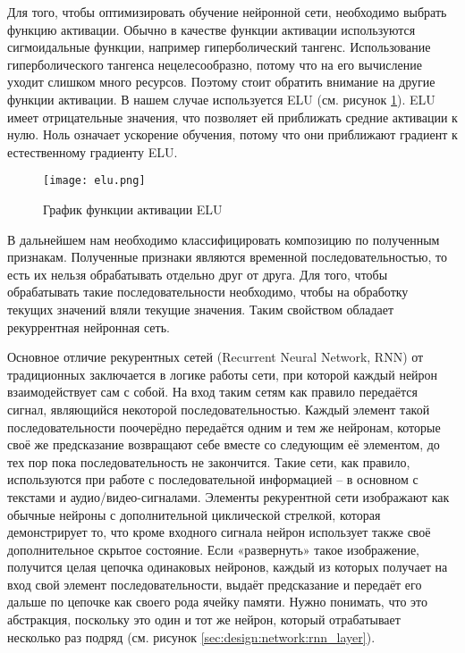 Для того, чтобы оптимизировать обучение нейронной сети, необходимо выбрать функцию активации. Обычно в качестве функции активации используются сигмоидальные функции, например гиперболический тангенс. Использование гиперболического тангенса нецелесообразно, потому что на его вычисление уходит слишком много ресурсов. Поэтому стоит обратить внимание на другие функции активации. В нашем случае используется ELU (см. рисунок \ref{sec:design:network:elu}). ELU имеет отрицательные значения, что позволяет ей приближать средние активации к нулю. Ноль означает ускорение обучения, потому что они приближают градиент к естественному градиенту ELU.

\begin{figure}[h]
\centering
	\texttt{[image: elu.png]}
	\caption{График функции активации ELU}
	\label{sec:design:network:elu}
\end{figure}

В дальнейшем нам необходимо классифицировать композицию по полученным признакам. Полученные признаки являются временной последовательностью, то есть их нельзя обрабатывать отдельно друг от друга. Для того, чтобы обрабатывать такие последовательности необходимо, чтобы на обработку текущих значений вляли текущие значения. Таким свойством обладает рекуррентная нейронная сеть.

Основное отличие рекурентных сетей (Recurrent Neural Network, RNN) от традиционных заключается в логике работы сети, при которой каждый нейрон взаимодействует сам с собой. На вход таким сетям как правило передаётся сигнал, являющийся некоторой последовательностью. Каждый элемент такой последовательности поочерёдно передаётся одним и тем же нейронам, которые своё же предсказание возвращают себе вместе со следующим её элементом, до тех пор пока последовательность не закончится. Такие сети, как правило, используются при работе с последовательной информацией -- в основном с текстами и аудио/видео-сигналами. Элементы рекурентной сети изображают как обычные нейроны с дополнительной циклической стрелкой, которая демонстрирует то, что кроме входного сигнала нейрон использует также своё дополнительное скрытое состояние. Если «развернуть» такое изображение, получится целая цепочка одинаковых нейронов, каждый из которых получает на вход свой элемент последовательности, выдаёт предсказание и передаёт его дальше по цепочке как своего рода ячейку памяти. Нужно понимать, что это абстракция, поскольку это один и тот же нейрон, который отрабатывает несколько раз подряд (см. рисунок \ref{sec:design:network:rnn_layer}).

